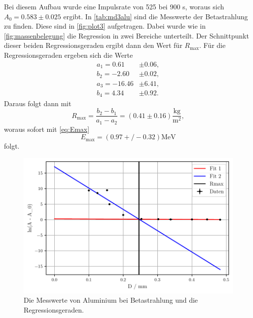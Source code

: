 Bei diesem Aufbau wurde eine Impulsrate von 525 bei 900 s, woraus sich $A_0 = 0.583 \pm 0.025$ ergibt.
In \autoref{tab:md3alu} sind die Messwerte der Betastrahlung zu finden.
Diese sind in \autoref{fig:plot3} aufgetragen.
Dabei wurde wie in \autoref{fig:massenbelegung} die Regression in zwei Bereiche unterteilt.
Der Schnittpunkt dieser beiden Regressionsgeraden ergibt dann den Wert für $R_\text{max}$.
Für die Regressionsgeraden ergeben sich die Werte 
\begin{align*}
    a_1= 0.61 &\pm 0.06,\\
    b_2= -2.60 &\pm 0.02,\\
    a_3= -16.46 &\pm 6.41,\\
    b_4= 4.34 &\pm 0.92.
\end{align*}
Daraus folgt dann mit
\begin{equation*}
    R_\text{max} = \frac{b_2 - b_1}{a_1 - a_2} = (0.41 \pm 0.16) \frac{\unit{\kilo\gram}}{\unit{\meter^2}} ,
\end{equation*}
woraus sofort mit \autoref{eq:Emax} 
\begin{equation*}
    E_\text{max} = (0.97+/-0.32) \unit{\mega\eV}
\end{equation*}
folgt.
\begin{figure}
    \centering
    \includegraphics[width=0.7 \linewidth]{build/plot3.pdf}
    \caption{Die Messwerte von Aluminium bei Betastrahlung und die Regressionsgeraden.}
    \label{fig:plot3}
\end{figure}


